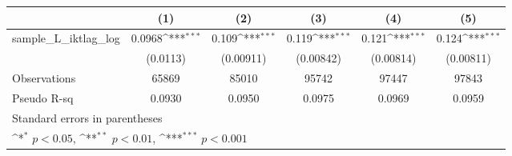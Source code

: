 {
\def\sym#1{\ifmmode^{#1}\else\(^{#1}\)\fi}
\begin{tabular}{l*{5}{c}}
\hline\hline
                &\multicolumn{1}{c}{(1)}         &\multicolumn{1}{c}{(2)}         &\multicolumn{1}{c}{(3)}         &\multicolumn{1}{c}{(4)}         &\multicolumn{1}{c}{(5)}         \\
\hline
sample\_L\_iktlag\_log&   0.0968\sym{***}&    0.109\sym{***}&    0.119\sym{***}&    0.121\sym{***}&    0.124\sym{***}\\
                & (0.0113)         &(0.00911)         &(0.00842)         &(0.00814)         &(0.00811)         \\
\hline
Observations    &    65869         &    85010         &    95742         &    97447         &    97843         \\
Pseudo R-sq     &   0.0930         &   0.0950         &   0.0975         &   0.0969         &   0.0959         \\
\hline\hline
\multicolumn{6}{l}{\footnotesize Standard errors in parentheses}\\
\multicolumn{6}{l}{\footnotesize \sym{*} \(p<0.05\), \sym{**} \(p<0.01\), \sym{***} \(p<0.001\)}\\
\end{tabular}
}
